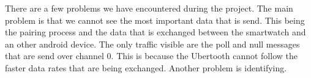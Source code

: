 \label{subsec:problems}
There are a few problems we have encountered during the project. The main problem is that we cannot see the most important data that is send. This being the pairing process and the data that is exchanged between the smartwatch and an other android device. The only traffic visible are the poll and null messages that are send over channel 0. This is because the Ubertooth cannot follow the faster data rates that are being exchanged. Another problem  is identifying. 